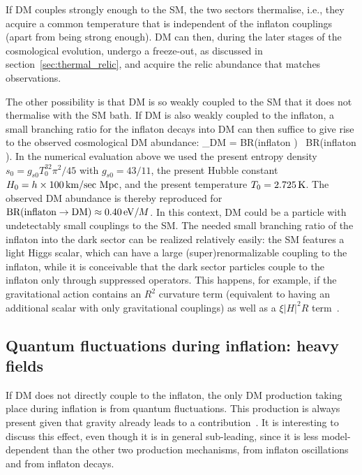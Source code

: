 If DM couples strongly enough to the SM, the two sectors thermalise, i.e., they acquire a common temperature
that is independent of the inflaton couplings (apart from being strong enough).
DM can then, during the later stages of the cosmological evolution, undergo a freeze-out, as discussed in section~\ref{sec:thermal_relic}, and acquire the relic abundance that matches observations.

The other possibility is that DM is so weakly coupled to the SM that it does not thermalise with the SM bath. If DM is also 
weakly coupled to the inflaton,
a small branching ratio for the inflaton decays into DM can then suffice to give rise to the observed cosmological DM abundance:
\beq \Omega_{\rm DM} \equiv {} =
 \hbox{BR}(\hbox{inflaton} )\approx
{} \times  {} \ \hbox{BR}(\hbox{inflaton} ).
\eeq
In the numerical evaluation above we used the present entropy density $s_0 = g_{s0} T_0^32\pi^2/45$ with $g_{s0} = {43}/{11}$,
the present Hubble constant $H_0 = h\times 100\,{\rm km}/{\rm sec~Mpc}$,
and the present temperature $T_0 = 2.725\,{\rm K}$.
The observed DM abundance is thereby reproduced for
$\hbox{BR}(\hbox{inflaton} \to {\rm DM}) \approx 0.40\,{\rm eV}/M$.
In this context, DM could be a particle with undetectably small couplings to the SM.
The needed small  branching ratio of the inflaton into the dark sector can be realized relatively easily:
the SM features a light Higgs scalar, which can have a large (super)renormalizable coupling to the inflaton,
while it is conceivable that the dark sector particles couple to the inflaton only through suppressed operators.
This happens, for example, if the gravitational action contains an $R^2$ curvature term
(equivalent to having an additional scalar with only gravitational couplings) as well as a $\xi |H|^2 R$ term~\cite{R2DM}.




\subsection{Quantum fluctuations during inflation: heavy fields}\label{sec:inflfluc}
If DM does not directly couple to the inflaton, the only DM production taking place during inflation is from quantum fluctuations. 
This production is always present given that gravity already leads to a contribution~\cite{GravDM}.
It is interesting to discuss this effect, even though it is in general sub-leading, since it is less model-dependent than the other two production mechanisms, from inflaton oscillations and from inflaton decays. 


